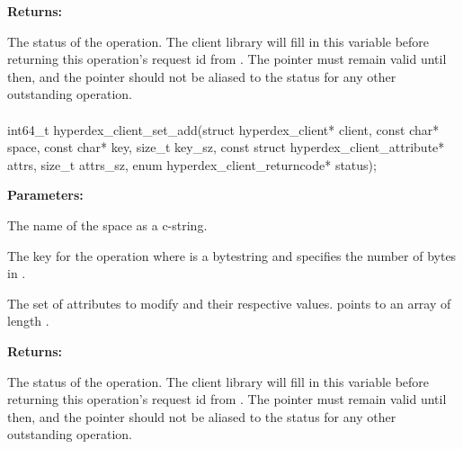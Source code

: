 \noindent\textbf{Returns:}
\begin{description}[labelindent=\widthof{{\code{status}}},leftmargin=*,noitemsep,nolistsep,align=right]
\item[\code{status}] The status of the operation.  The client library will fill in this variable before returning this operation's request id from .  The pointer must remain valid until then, and the pointer should not be aliased to the status for any other outstanding operation.
\end{description}

\paragraph{}
\label{api:c:set_add}
\begin{ccode}
int64_t hyperdex_client_set_add(struct hyperdex_client* client,
                const char* space,
                const char* key, size_t key_sz,
                const struct hyperdex_client_attribute* attrs, size_t attrs_sz,
                enum hyperdex_client_returncode* status);
\end{ccode}
\funcdesc 

\noindent\textbf{Parameters:}
\begin{description}[labelindent=\widthof{{\code{attrs}, \code{attrs\_sz}}},leftmargin=*,noitemsep,nolistsep,align=right]
\item[\code{space}] The name of the space as a c-string.
\item[\code{key}, \code{key\_sz}] The key for the operation where  is a bytestring and  specifies the number of bytes in .
\item[\code{attrs}, \code{attrs\_sz}] The set of attributes to modify and their respective values.   points to an array of length .
\end{description}

\noindent\textbf{Returns:}
\begin{description}[labelindent=\widthof{{\code{status}}},leftmargin=*,noitemsep,nolistsep,align=right]
\item[\code{status}] The status of the operation.  The client library will fill in this variable before returning this operation's request id from .  The pointer must remain valid until then, and the pointer should not be aliased to the status for any other outstanding operation.
\end{description}

